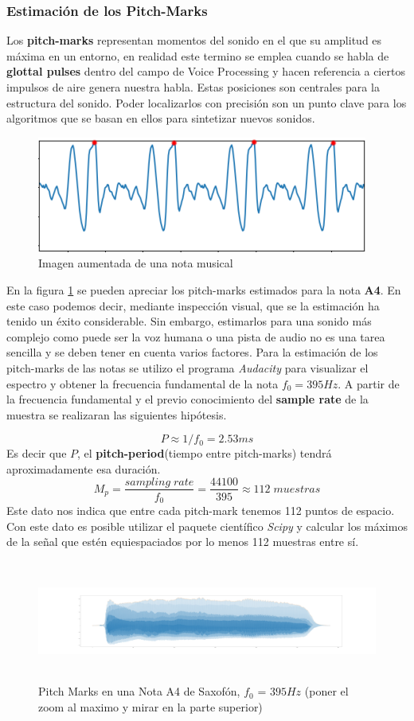 \subsubsection{Estimación de los Pitch-Marks}
Los \textbf{pitch-marks} representan momentos del sonido en el que su amplitud es máxima en un entorno, en realidad este termino se emplea cuando se habla de \textbf{glottal pulses} dentro del campo de Voice Processing y hacen referencia a ciertos impulsos de aire genera nuestra habla.
Estas posiciones son centrales para la estructura del sonido. Poder localizarlos con precisión son un punto clave para los algoritmos que se basan en ellos para sintetizar nuevos sonidos.
\begin{figure}[H]
	\centering
	\includegraphics[width=0.7\linewidth]{ImagenesEjercicio5/soundZoomPMS.PNG}
	\caption{Imagen aumentada de una nota musical}
	\label{fig:soundzoom}
\end{figure}
En la figura \ref{fig:soundzoom} se pueden apreciar los pitch-marks estimados para la nota \textbf{A4}. En este caso podemos decir, mediante inspección visual, que se la estimación ha tenido un éxito considerable. Sin embargo, estimarlos para una sonido más complejo como puede ser la voz humana o una pista de audio no es una tarea sencilla y se deben tener en cuenta varios factores.
Para la estimación de los pitch-marks de las notas se utilizo el programa \textit{Audacity} para visualizar el espectro y obtener la frecuencia fundamental de la nota $f_0 = 395Hz$. A partir de la frecuencia fundamental y el previo conocimiento del \textbf{sample rate} de la muestra se realizaran las siguientes hipótesis.
	
	$$	P \approx 1/f_0 = 2.53ms$$
Es decir que $P$, el \textbf{pitch-period}(tiempo entre pitch-marks) tendrá aproximadamente esa duración.
$$ M_p = \frac{sampling\;rate}{f_0} = \frac{44100}{395} \approx 112\; muestras  $$
Este dato nos indica que entre cada pitch-mark tenemos 112 puntos de espacio. Con este dato es posible utilizar el paquete científico \textit{Scipy} y calcular los máximos de la señal que estén equiespaciados por lo menos 112 muestras entre sí.
\begin{figure}[H]
	\centering
	\includegraphics[width=\linewidth,height=150px]{ImagenesEjercicio5/noteA4}
	\caption{Pitch Marks en una Nota A4 de Saxofón, $f_0$ = $395Hz$ (poner el zoom  al maximo y mirar en la parte superior)}
	\label{fig:pmsnotea4}
\end{figure}

